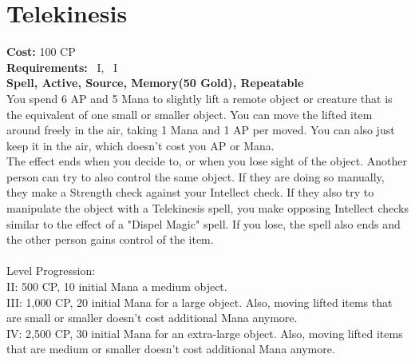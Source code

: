 \section{Telekinesis}\label{spell:telekinesis}
\textbf{Cost:} 100 CP\\
\textbf{Requirements:}~ I,~ I\\
\textbf{Spell, Active, Source, Memory(50 Gold), Repeatable}\\
You spend 6 AP and 5 Mana to slightly lift a remote object or creature that is the equivalent of one small or smaller object.
You can move the lifted item around freely in the air, taking 1 Mana and 1 AP per  moved.
You can also just keep it in the air, which doesn't cost you AP or Mana.\\
The effect ends when you decide to, or when you lose sight of the object.
Another person can try to also control the same object.
If they are doing so manually, they make a Strength check against your Intellect check.
If they also try to manipulate the object with a Telekinesis spell, you make opposing Intellect checks similar to the effect of a "Dispel Magic" spell.
If you lose, the spell also ends and the other person gains control of the item.\\
\\
Level Progression:\\
II: 500 CP, 10 initial Mana a medium object.\\

III: 1,000 CP, 20 initial Mana for a large object.
Also, moving lifted items that are small or smaller doesn't cost additional Mana anymore.\\

IV: 2,500 CP, 30 initial Mana for an extra-large object.
Also, moving lifted items that are medium or smaller doesn't cost additional Mana anymore.